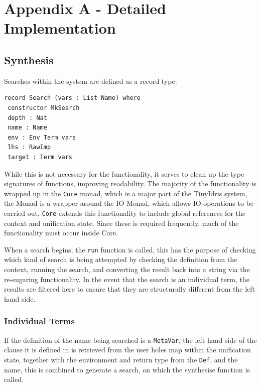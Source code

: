 \documentclass[a4paper]{article}
\begin{document}
\label{sec:org30d868f}
\section{Appendix A - Detailed Implementation}
\label{sec:org4318281}

\subsection{Synthesis}
Searches within the system are defined as a record type:

\begin{center}
  \begin{verbatim}
record Search (vars : List Name) where
 constructor MkSearch
 depth : Nat
 name : Name
 env : Env Term vars
 lhs : RawImp
 target : Term vars 
  \end{verbatim}
\end{center}

While this is not necessary for the functionality, it serves
to clean up the type signatures of functions, improving readability. 
The majority of the functionality is wrapped up in the \texttt{Core}
monad, which is a major part of the TinyIdris system, the Monad
is a wrapper around the IO Monad, which allows IO operations to be
carried out, \texttt{Core} extends this functionality to include
global references for the context and unification state. Since these
is required frequently, much of the functionality must occur inside
Core. 

When a search begins, the \texttt{run} function is called, this
has the purpose of checking which kind of search is being attempted by
checking the definition from the context, running the search, and
converting the result back into a string via the re-sugaring
functionality. In the event that the search is an individual term,
the results are filtered here to ensure that they are structurally
different from the left hand side.

\subsubsection{Individual Terms}
If the definition of the name being searched is a \texttt{MetaVar},
the left hand side of the clause it is defined in is retrieved from
the user holes map within the unification state, together with the
environment and return type from the \texttt{Def}, and the name,
this is combined to generate a search, on which the synthesise function
is called.
\end{document}
